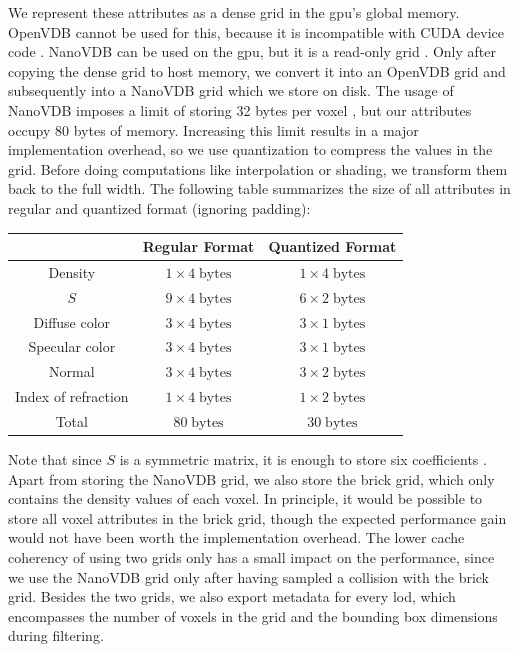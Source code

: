 We represent these attributes as a dense grid in the \acs{gpu}'s global memory.
OpenVDB cannot be used for this, because it is incompatible with CUDA device code \cite{museth_nanovdb}.
NanoVDB can be used on the \ac{gpu}, but it is a read-only grid \cite{nanovdb}.
Only after copying the dense grid to host memory, we convert it into an OpenVDB grid and subsequently into a NanoVDB grid which we store on disk.
The usage of NanoVDB imposes a limit of storing 32 bytes per voxel \cite{open_to_nanovdb}, but our attributes occupy 80 bytes of memory.
Increasing this limit results in a major implementation overhead, so we use quantization to compress the values in the grid.
Before doing computations like interpolation or shading, we transform them back to the full width.
The following table summarizes the size of all attributes in regular and quantized format (ignoring padding):
\begin{center}
    \begin{tabular}{| c | c | c | }
        \hline
         & Regular Format & Quantized Format \\
         \hline
         Density & $1\times 4\;\text{bytes}$ & $1\times 4\;\text{bytes}$ \\
         \hline
         $S$ & $9\times 4\;\text{bytes}$ & $6\times 2\;\text{bytes}$ \\
         \hline
         Diffuse color & $3\times 4\;\text{bytes}$ & $3\times 1\;\text{bytes}$ \\
         \hline
         Specular color & $3\times 4\;\text{bytes}$ & $3\times 1\;\text{bytes}$ \\
         \hline
         Normal & $3\times 4\;\text{bytes}$ & $3\times 2\;\text{bytes}$ \\
         \hline
         Index of refraction & $1\times 4\;\text{bytes}$ & $1\times 2\;\text{bytes}$ \\
         \thickhline
         Total & $80\;\text{bytes}$ & $30\;\text{bytes}$ \\
         \hline
    \end{tabular}
\end{center}
Note that since $S$ is a symmetric matrix, it is enough to store six coefficients \cite{sggx}.
Apart from storing the NanoVDB grid, we also store the brick grid, which only contains the density values of each voxel.
In principle, it would be possible to store all voxel attributes in the brick grid, though the expected performance gain would not have been worth the implementation overhead.
The lower cache coherency of using two grids only has a small impact on the performance, since we use the NanoVDB grid only after having sampled a collision with the brick grid.
Besides the two grids, we also export metadata for every \ac{lod}, which encompasses the number of voxels in the grid and the bounding box dimensions during filtering.

